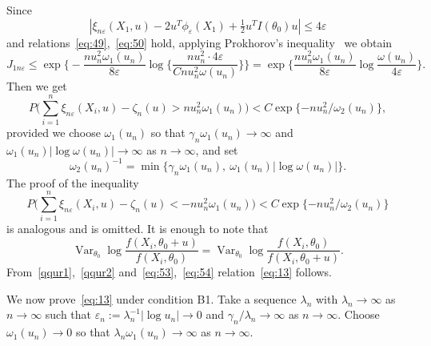 \documentclass[11pt,a4paper]{article}
\begin{document}
Since
\begin{equation}
|\xi_{n\varepsilon}(X_1,u)-2u^T\phi_\varepsilon(X_1)+\tfrac12 u^T I(\theta_0)u|\le 4\varepsilon
\label{eq:51}
\end{equation}
and relations~\eqref{eq:49},~\eqref{eq:50} hold, applying Prokhorov's inequality~\cite{15} we obtain
\begin{equation}
J_{1n\varepsilon}\le\exp\Biggl\{-\frac{nu_n^2\omega_1(u_n)}{8\varepsilon}\log\Biggl\{\frac{nu_n^2\cdot4\varepsilon}{Cnu_n^2\omega(u_n)}\Biggr\}\Biggr\}
=\exp\Biggl\{\frac{nu_n^2\omega_1(u_n)}{8\varepsilon}\log\frac{\omega(u_n)}{4\varepsilon}\Biggr\}.
\label{eq:52}
\end{equation}
Then we get
\begin{equation}
P\Biggl(\sum_{i=1}^n\xi_{n\varepsilon}(X_i,u)-\zeta_n(u)>nu_n^2\omega_1(u_n)\Biggr)<C\exp\{-nu_n^2/\omega_2(u_n)\},
\label{eq:53}
\end{equation}
provided we choose $\omega_1(u_n)$ so that $\gamma_n\omega_1(u_n)\to\infty$ and $\omega_1(u_n)|\log\omega(u_n)|\to\infty$ as $n\to\infty$, and set
\[
\omega_2(u_n)^{-1}=\min\bigl\{\gamma_n\omega_1(u_n),\ \omega_1(u_n)|\log\omega(u_n)|\bigr\}.
\]
The proof of the inequality
\begin{equation}
P\Biggl(\sum_{i=1}^n\xi_{n\varepsilon}(X_i,u)-\zeta_n(u)<-nu_n^2\omega_1(u_n)\Biggr)<C\exp\{-nu_n^2/\omega_2(u_n)\}
\label{eq:54}
\end{equation}
is analogous and is omitted. It is enough to note that
\begin{equation}
\operatorname{Var}_{\theta_0}\log\frac{f(X_i,\theta_0+u)}{f(X_i,\theta_0)}=\operatorname{Var}_{\theta_0}\log\frac{f(X_i,\theta_0)}{f(X_i,\theta_0+u)}.
\label{eq:55}
\end{equation}
From~\ref{qqur1},~\ref{qqur2} and~\eqref{eq:53},~\eqref{eq:54} relation~\eqref{eq:13} follows.

We now prove~\eqref{eq:13} under condition B1. Take a sequence $\lambda_n$ with $\lambda_n\to\infty$ as $n\to\infty$ such that $\varepsilon_n:=\lambda_n^{-1}|\log u_n|\to0$ and $\gamma_n/\lambda_n\to\infty$ as $n\to\infty$. Choose $\omega_1(u_n)\to0$ so that $\lambda_n\omega_1(u_n)\to\infty$ as $n\to\infty$.
\end{document}

